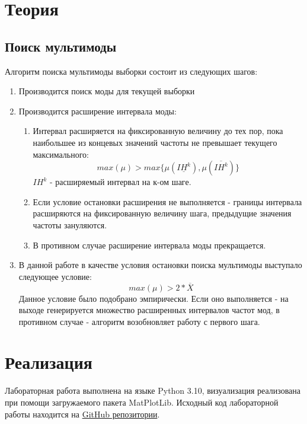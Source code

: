 \documentclass[12pt,a4paper]{article}
\begin{document}
	\section{Теория}
            \subsection{Поиск мультимоды}
                Алгоритм поиска мультимоды выборки состоит из следующих шагов:
                \begin{enumerate}
                    \item Производится поиск моды для текущей выборки
                    \item Производится расширение интервала моды:
                    \begin{enumerate}
                        \item Интервал расширяется на фиксированную величину до тех пор, пока наибольшее из концевых значений частоты не превышает текущего максимального:
                        \begin{equation}
                            max(\mu) > max\{\mu(\underline{IH^k}), \mu(\overline{IH^k})\}
                        \end{equation}
                        $IH^k$ - расширяемый интервал на к-ом шаге.\\ 
                        \item Если условие остановки расширения не выполняется - границы интервала расширяются на фиксированную величину шага, предыдущие значения частоты зануляются.
                        \item В противном случае расширение интервала моды прекращается.
                    \end{enumerate}
                    \item В данной работе в качестве условия остановки поиска мультимоды выступало следующее условие:
                    \begin{equation}
                        max(\mu) > 2 * \overline{X}
                    \end{equation}
                    Данное условие было подобрано эмпирически. Если оно выполняется - на выходе генерируется множество расширенных интервалов частот мод, в противном случае - алгоритм возобновляет работу с первого шага.
                \end{enumerate}
                
	\newpage
	
	\section{Реализация}
		Лабораторная работа выполнена на языке Python 3.10, визуализация реализована при помощи загружаемого пакета MatPlotLib. Исходный код лабораторной работы находится на \href{https://github.com/Drusiand/SPbSTU_Interval_Analysis.git}{GitHub репозитории}.
	\newpage
	
\end{document}
